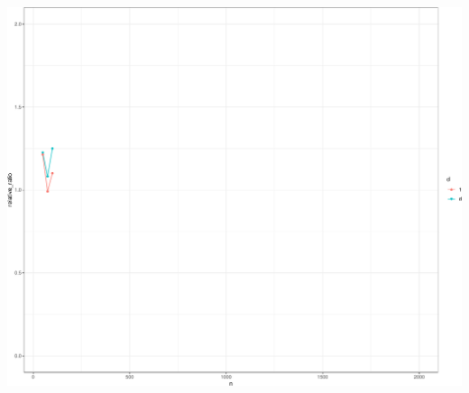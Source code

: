 \documentclass[]{article}
\begin{document}
\includegraphics{GCTA_and_rr_v_jack_correction_iterations_files/figure-latex/unnamed-chunk-15-1.pdf}
\end{document}
